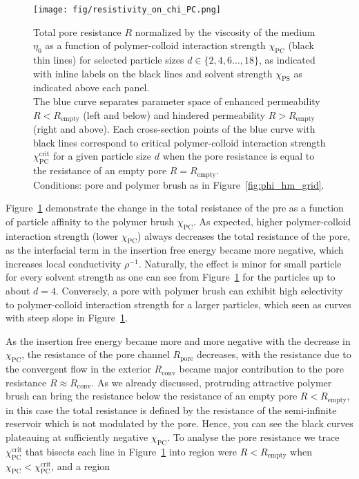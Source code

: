 \documentclass[12pt, a4paper]{article}
\begin{document}
\begin{figure}
    \centering
    \texttt{[image: fig/resistivity\_on\_chi\_PC.png]}
    \caption{
        Total pore resistance $R$ normalized by the viscosity of the medium $\eta_0$ as a function of polymer-colloid interaction strength $\chi_{\text{PC}}$ (black thin lines) for selected particle sizes $d \in \{2,4,6\dots,18\}$, as indicated with inline labels on the black lines and solvent strength $\chi_{\text{PS}}$ as indicated above each panel.
        \\
        The blue curve separates parameter space of enhanced permeability $R<R_{\text{empty}}$ (left and below) and hindered permeability $R>R_{\text{empty}}$ (right and above).
        Each cross-section points of the blue curve with black lines correspond to critical  polymer-colloid interaction strength $\chi_{\text{PC}}^{\text{crit}}$ for a given particle size $d$ when the pore resistance is equal to the resistance of an empty pore $R=R_{\text{empty}}$.
        \\
        Conditions: pore and polymer brush as in Figure~\ref{fig:phi_hm_grid}.
    }
    \label{fig:R_vs_chi_PC}
\end{figure}

Figure~\ref{fig:R_vs_chi_PC} demonstrate the change in the total resistance of the pre as a function of particle affinity to the polymer brush $\chi_{\text{PC}}$.
As expected, higher polymer-colloid interaction strength (lower $\chi_{\text{PC}}$) always decreases the total resistance of the pore, as the interfacial term in the insertion free energy became more negative, which increases local conductivity $\rho^{-1}$.
Naturally, the effect is minor for small particle for every solvent strength as one can see from Figure~\ref{fig:R_vs_chi_PC} for the particles up to about $d=4$.
Conversely, a pore with polymer brush can exhibit high selectivity to polymer-colloid interaction strength for a larger particles, which seen as curves with steep slope in Figure~\ref{fig:R_vs_chi_PC}.

As the insertion free energy became more and more negative with the decrease in $\chi_{\text{PC}}$, the resistance of the pore channel $R_{\text{pore}}$ decreases, with the resistance due to the convergent flow in the exterior $R_{\text{conv}}$ became major contribution to the pore resistance $R \approx R_{\text{conv}}$.
As we already discussed, protruding attractive polymer brush can bring the resistance below the resistance of an empty pore $R<R_{\text{empty}}$, in this case the total resistance is defined by the resistance of the semi-infinite reservoir which is not modulated by the pore.
Hence, you can see the black curves plateauing at sufficiently negative $\chi_{\text{PC}}$.
To analyse the pore resistance we trace $\chi_{\text{PC}}^{\text{crit}}$ that bisects each line in Figure~\ref{fig:R_vs_chi_PC} into region were $R<R_{\text{empty}}$ when $\chi_{\text{PC}} < \chi_{\text{PC}}^{\text{crit}}$, and a region
\end{document}
